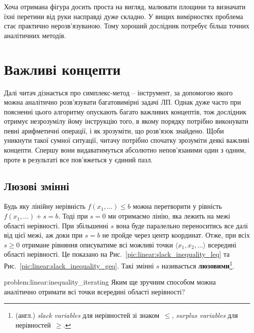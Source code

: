 \documentclass[\main/book.tex]{subfiles}
\begin{document}
\begin{note}
 Хоча отримана фігура досить проста на вигляд, малювати площини та визначати їхні перетини від руки насправді дуже складно. У вищих вимірностях проблема стає практично нерозв'язуваною. Тому хороший дослідник потребує більш точних аналітичних методів.
\end{note}

\section{Важливі концепти}

Далі читач дізнається про симплекс-метод -- інструмент, за допомогою якого можна аналітично розв'язувати багатовимірні задачі ЛП. Однак дуже часто при поясненні цього алгоритму опускають багато важливих концептів, тож дослідник отримує незрозумілу йому інструкцію того, в якому порядку потрібно виконувати певні арифметичні операції, і як зрозуміти, що розв'язок знайдено. Щоби уникнути такої сумної ситуації, читачу потрібно спочатку зрозуміти деякі важливі концепти. Спершу вони видаватимуться абсолютно непов'язаними один з одним, проте в результаті все пов'яжеться у єдиний пазл.

\subsection{Люзові змінні}

Будь яку лінійну нерівність $f(x_1, \ldots) \leq b$ можна перетворити у рівність $f(x_1, \ldots) + s = b$. Тоді при ${s=0}$ ми отримаємо лінію, яка лежить на межі області нерівності. При збільшенні $s$ вона буде паралельно переноситись все далі від цієї межі, аж доки при $s=b$ не пройде через центр координат. Отже, при всіх $s \geq 0$ отримане рівняння описуватиме всі можливі точки $\langle x_1, x_2, \ldots \rangle$ всередині області нерівності. Це показано на Рис.~\ref{pic:linear:slack_inequality_leq} та Рис.~\ref{pic:linear:slack_inequality_geq}. Такі змінні $s$ називається \textbf{люзовими}\footnote{(англ.) \textit{slack variables} для нерівностей зі знаком~\flqq{}$\leq$\frqq{}, \textit{surplus variables} для нерівностей~\flqq{}$\geq$\frqq{}.}.

\begin{problem}{problem:linear:inequality_iterating}
 Яким ще зручним способом можна аналітично отримати всі точки всередині області нерівності?
\end{problem}
\end{document}
